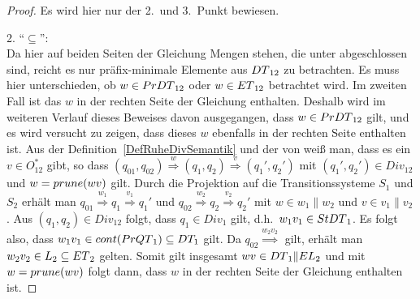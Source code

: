 \begin{proof} Es wird hier nur der 2.\ und 3.\ Punkt bewiesen.

  2. ``$\subseteq$'':\\
  Da hier auf beiden Seiten der Gleichung Mengen stehen, die unter \cont{}
  abgeschlossen sind, reicht es nur präfix-minimale Elemente aus $DT{}_{12}$
  zu betrachten. Es muss hier unterschieden, ob $w\in PrDT{}_{12}$ oder $w\in
  ET{}_{12}$ betrachtet wird. Im zweiten Fall ist das $w$ in der rechten Seite
  der Gleichung enthalten. Deshalb wird im weiteren Verlauf dieses Beweises
  davon ausgegangen, dass $w\in PrDT{}_{12}$ gilt, und es wird versucht zu
  zeigen, dass dieses $w$ ebenfalls in der rechten Seite enthalten ist. Aus der
  Definition~\ref{DefRuheDivSemantik} und der von \prune{} weiß man, dass es
  ein $v\in O^*_{12}$ gibt, so dass $(q_{01},q_{02}) \overset{w}{\Rightarrow}
  (q_1,q_2) \overset{v}{\Rightarrow} (q_1',q_2')$ mit $(q_1',q_2')\in Div_{12}$
  und $w = prune{}(wv)$ gilt. Durch die Projektion auf die Transitionssysteme
  $S_1$ und $S_2$ erhält man $q_{01} \overset{w_1}{\Rightarrow} q_1
  \overset{v_1}{\Rightarrow} q_1'$ und $q_{02} \overset{w_2}{\Rightarrow} q_2
  \overset{v_2}{\Rightarrow} q_2'$ mit $w\in w_1\|w_2$ und $v\in v_1\|v_2$. Aus
  $(q_1,q_2)\in Div_{12}$ folgt, dass \oBdA{} $q_1\in Div_1$ gilt, d.h.\
  $w_1v_1\in StDT{}_1$. Es folgt also, dass $w_1v_1\in
  cont{}(PrQT{}_1)\subseteq DT_1$ gilt. Da $q_{02}
  \overset{w_2v_2}{\Rightarrow}$ gilt, erhält man $w_2v_2\in L_2\subseteq
  ET{}_2$ gelten. Somit gilt insgesamt $wv\in DT{}_1\|EL{}_2$ und mit $w =
  prune{}(wv)$ folgt dann, dass $w$ in der rechten Seite der Gleichung
  enthalten ist.


\end{proof}
